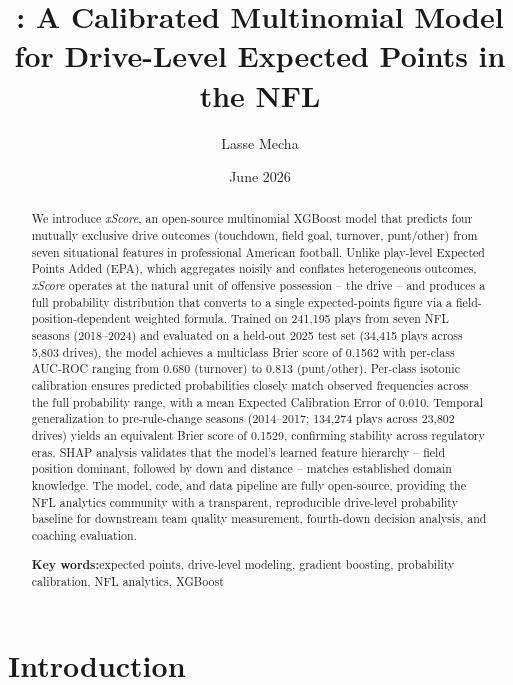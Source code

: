 \documentclass[12pt,a4paper]{article}
\title{\xscore{}: A Calibrated Multinomial Model for Drive-Level Expected Points in the NFL}
\author{Lasse Mecha}
\date{June 2026}
\newcommand{\xscore}{\textit{xScore}}
\begin{document}
\maketitle

\begin{abstract}
We introduce \xscore{}, an open-source multinomial XGBoost model that predicts four mutually exclusive drive outcomes (touchdown, field goal, turnover, punt/other) from seven situational features in professional American football. Unlike play-level Expected Points Added (EPA), which aggregates noisily and conflates heterogeneous outcomes, \xscore{} operates at the natural unit of offensive possession -- the drive -- and produces a full probability distribution that converts to a single expected-points figure via a field-position-dependent weighted formula. Trained on 241,195 plays from seven NFL seasons (2018--2024) and evaluated on a held-out 2025 test set (34,415 plays across 5,803 drives), the model achieves a multiclass Brier score of 0.1562 with per-class AUC-ROC ranging from 0.680 (turnover) to 0.813 (punt/other). Per-class isotonic calibration ensures predicted probabilities closely match observed frequencies across the full probability range, with a mean Expected Calibration Error of 0.010. Temporal generalization to pre-rule-change seasons (2014--2017; 134,274 plays across 23,802 drives) yields an equivalent Brier score of 0.1529, confirming stability across regulatory eras. SHAP analysis validates that the model's learned feature hierarchy -- field position dominant, followed by down and distance -- matches established domain knowledge. The model, code, and data pipeline are fully open-source, providing the NFL analytics community with a transparent, reproducible drive-level probability baseline for downstream team quality measurement, fourth-down decision analysis, and coaching evaluation.
\par\bigskip\noindent\textbf{Key words:}\quad expected points, drive-level modeling, gradient boosting, probability calibration, NFL analytics, XGBoost
\end{abstract}

\section{Introduction}
\label{sec:introduction}
\end{document}
